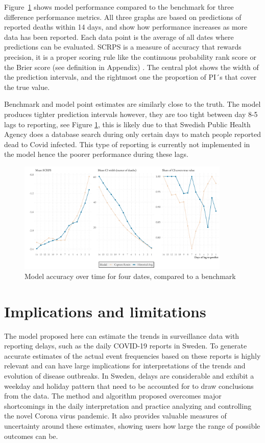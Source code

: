 \documentclass[a4paper,11pt,article,oneside,openany,american]{memoir}
\begin{document}
Figure~\ref{fig:model_metrics} shows model performance compared to the benchmark for three difference performance metrics. All three graphs are based on predictions of reported deaths within 14 days, and show how performance increases as more data has been reported. Each data point is the average of all dates where predictions can be evaluated. SCRPS is a measure of accuracy that rewards precision, it is a proper scoring rule like the continuous probability rank score or the Brier score (see definition in Appendix) \cite{bolin2019scale}. The central plot shows the width of the prediction intervals, and the rightmost one the proportion of PI´s that cover the true value.

Benchmark and model point estimates are similarly close to the truth. The model produces tighter prediction intervals however, they are too tight between day 8-5 lags to reporting, see Figure \ref{fig:model_metrics}, this is likely due to that Swedish Public Health Agency does a database search during only certain days to match people reported dead to Covid infected. This type of reporting is currently not implemented in the model hence the poorer performance during these lags. 

\begin{figure}
    \centering
    \includegraphics[width=0.9\textwidth]{../plots/model_metrics}
    \caption{Model accuracy over time for four dates, compared to a benchmark}
    \label{fig:model_metrics}
\end{figure}

\chapter{Implications and limitations}
The model proposed here can estimate the trends in surveillance data with reporting delays, such as the daily COVID-19 reports in Sweden. To generate accurate estimates of the actual event frequencies based on these reports is highly relevant and can have large implications for interpretations of the trends and evolution of disease outbreaks. In Sweden, delays are considerable and exhibit a weekday and holiday pattern that need to be accounted for to draw conclusions from the data. The method and algorithm proposed overcomes major shortcomings in the daily interpretation and practice analyzing and controlling the novel Corona virus pandemic. It also provides valuable measures of uncertainty around these estimates, showing users how large the range of possible outcomes can be.
\end{document}
